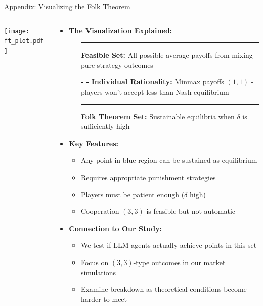 \documentclass[10pt, aspectratio=169]{beamer}
\begin{document}
\begin{frame}{Appendix: Visualizing the Folk Theorem}\label{app:ft}
    \begin{columns}[T]
    
    \begin{column}{0.55\textwidth}
        \centering
        \texttt{[image: ft\_plot.pdf]}
    \end{column}
    
    \begin{column}{0.45\textwidth}
        \small
        \begin{itemize}
            \item \textbf{The Visualization Explained:}
            \begin{itemize}
                \item[\textcolor{gray!60}{\rule{0.3cm}{0.3cm}}] \textbf{Feasible Set:} All possible average payoffs from mixing pure strategy outcomes
                \item[\textbf{- -}] \textbf{Individual Rationality:} Minmax payoffs $(1,1)$ - players won't accept less than Nash equilibrium
                \item[\textcolor{orange}{\rule{0.3cm}{0.3cm}}] \textbf{Folk Theorem Set:} Sustainable equilibria when $\delta$ is sufficiently high
            \end{itemize}
            \item \textbf{Key Features:}
            \begin{itemize}
                \item Any point in blue region can be sustained as equilibrium
                \item Requires appropriate punishment strategies
                \item Players must be patient enough ($\delta$ high)
                \item Cooperation $(3,3)$ is feasible but not automatic
            \end{itemize}
            \item \textbf{Connection to Our Study:}
            \begin{itemize}
                \item We test if LLM agents actually achieve points in this set
                \item Focus on $(3,3)$-type outcomes in our market simulations
                \item Examine breakdown as theoretical conditions become harder to meet
            \end{itemize}
        \end{itemize}
    \end{column}
    \end{columns}
\end{frame}
\end{document}
